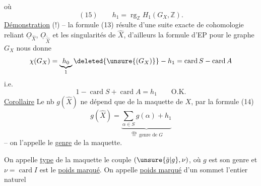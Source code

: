 où 
\[
(15)\qquad h_1=\operatorname{rg}_{\mathbb Z}H_1(G_X,\mathbb Z).
\]
\uline{Démonstration}  (!) -- la formule (13) résulte d'une suite exacte  de cohomologie reliant $\underline O_{\widehat X}$, $\underline O_{\widetilde{\widehat X}}$ et les singularités de $\widehat X$, d'ailleurs la formule d'EP pour le graphe $G_X$ nous donne
\[
\chi(G_X)=\underbrace{h_0}_{1}\deleted{\unsure{(G_X)}}-h_1=\operatorname{card}S-\operatorname{card}A
\]
i.e.
\[
1-\operatorname{card}S+\operatorname{card}A=h_1\qquad\text{O.K.}
\]
\uline{Corollaire} Le nb $g(\widehat X)$ ne dépend que de la maquette de $X$, par la formule (14)
\[
g(\widehat X)=\underbrace{\sum_{\alpha\in S}g(\alpha)+h_1}_{\overset{\mathrm{dfn}}{=}\ \text{genre de }G}
\]
-- on l'appelle le \uline{genre} de la maquette.

On appelle \uline{type} de la maquette le couple $(\unsure{\bar g|g},\nu)$, où $g$ est son genre et $\nu=\operatorname{card}I$ est le \uline{poids marqué}. On appelle \uline{poids marqué} d'un sommet l'entier naturel
